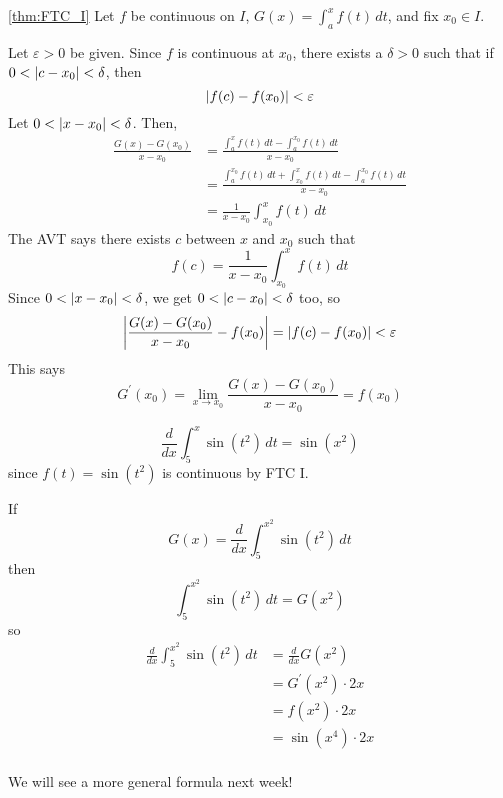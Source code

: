 \begin{Proof}{\ref{thm:FTC_I}}{}
    Let $ f $ be continuous on $ I $, $ G(x)=\int_{a}^{x} f(t)\, d{t} $,
    and fix $ x_0\in I $.

    Let $ \varepsilon>0 $ be given. Since $ f $ is continuous at $ x_0 $,
    there exists a $ \delta>0 $ such that if $ 0<\abs{c-x_0}<\delta $, then
    \[ \abs{f(c)-f(x_0)}<\varepsilon \]
    Let $ 0<\abs{x-x_0}<\delta $. Then,
    \begin{align*}
        \frac{G(x)-G(x_0)}{x-x_0}
         & =\frac{\int_{a}^{x} f(t)\, d{t} -\int_{a}^{x_0} f(t)\, d{t} }
        {x-x_0}                                                           \\
         & =\frac{\int_{a}^{x_0} f(t)\, d{t} +\int_{x_0}^{x} f(t)\, d{t}-
        \int_{a}^{x_0} f(t)\, d{t} }{x-x_0}                               \\
         & =\frac{1}{x-x_0} \int_{x_0}^{x} f(t)\, d{t}
    \end{align*}
    The AVT says there exists $ c $ between $ x $ and $ x_0 $ such that
    \[ f(c)=\frac{1}{x-x_0} \int_{x_0}^{x} f(t)\, d{t}  \]
    Since $ 0<\abs{x-x_0}<\delta $, we get $ 0<\abs{c-x_0}<\delta $ too,
    so
    \[
        \abs*{\frac{G(x)-G(x_0)}{x-x_0}-f(x_0)}=\abs{f(c)-f(x_0)}<\varepsilon
    \]
    This says
    \[ G^\prime(x_0)=\lim\limits_{{x} \to {x_0}} \frac{G(x)-G(x_0)}{x-x_0}=f(x_0) \]
\end{Proof}

\begin{Example}{}{}
    \[ \frac{d}{dx}\int_{5}^{x} \sin(t^2)\, d{t}
        =\sin(x^2) \]
    since $ f(t)=\sin(t^2) $ is continuous by FTC I.
\end{Example}

\begin{Example}{}{}
    If
    \[ G(x)=\frac{d}{dx}\int_{5}^{x^2} \sin(t^2)\, d{t} \]
    then
    \[ \int_{5}^{x^2} \sin(t^2)\, d{t}=G(x^2) \]
    so
    \begin{align*}
        \frac{d}{dx} \int_{5}^{x^2} \sin(t^2)\, d{t}
         & =\frac{d}{dx} G(x^2)   \\
         & =G^\prime(x^2)\cdot 2x \\
         & =f(x^2)\cdot 2x        \\
         & =\sin(x^4)\cdot 2x     \\
    \end{align*}
\end{Example}

We will see a more general formula next week!

